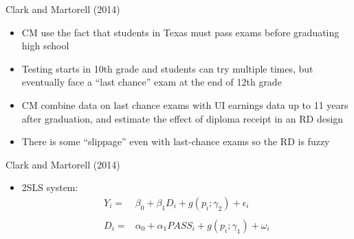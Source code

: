 \documentclass[blue]{beamer}
\begin{document}
{{{ 
\begin{frame}{Clark and Martorell (2014)}

\begin{itemize}
\item CM use the fact that students in Texas must pass exams before graduating
high school{\small{}\medskip{}
}{\small \par}
\item Testing starts in 10th grade and students can try multiple times,
but eventually face a ``last chance'' exam at the end of 12th grade{\small{}\medskip{}
}{\small \par}
\item CM combine data on last chance exams with UI earnings data up to 11
years after graduation, and estimate the effect of diploma receipt
in an RD design{\small{}\medskip{}
}{\small \par}
\item There is some ``slippage'' even with last-chance exams \textendash{}
so the RD is fuzzy
\end{itemize}
\end{frame}

\begin{frame}{Clark and Martorell (2014)}

\begin{itemize}
\item 2SLS system:
\begin{align*}
Y_{i}= & \beta_{0}+\beta_{1}D_{i}+g\left(p_{i};\gamma_{2}\right)+\epsilon_{i}\\
\\
D_{i}= & \alpha_{0}+\alpha_{1}PASS_{i}+g(p_{i};\gamma_{1})+\omega_{i}
\end{align*}
\end{itemize}
\end{frame}






}}}
\end{document}
